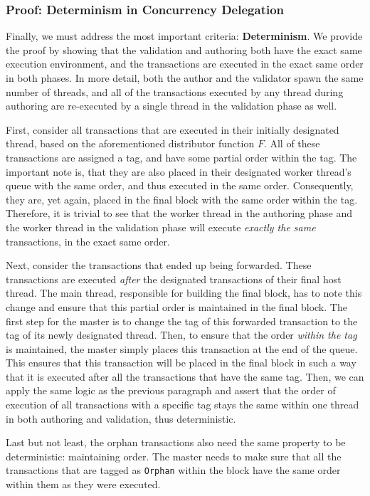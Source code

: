 \subsubsection{Proof: Determinism in Concurrency Delegation}

Finally, we must address the most important criteria: \textbf{Determinism}. We provide the proof by
showing that the validation and authoring both have the exact same execution environment, and the
transactions are executed in the exact same order in both phases. In more detail, both the author
and the validator spawn the same number of threads, and all of the transactions executed by any
thread during authoring are re-executed by a single thread in the validation phase as well.

First, consider all transactions that are executed in their initially designated thread, based on
the aforementioned distributor function $F$. All of these transactions are assigned a tag, and have
some partial order within the tag. The important note is, that they are also placed in their
designated worker thread's queue with the same order, and thus executed in the same order.
Consequently, they are, yet again, placed in the final block with the same order within the tag.
Therefore, it is trivial to see that the worker thread in the authoring phase and the worker thread
in the validation phase will execute \textit{exactly the same} transactions, in the exact same
order.

Next, consider the transactions that ended up being forwarded. These transactions are
executed \textit{after} the designated transactions of their final host thread. The main thread,
responsible for building the final block, has to note this change and ensure that this partial
order is maintained in the final block. The first step for the master is to change the tag of this
forwarded transaction to the tag of its newly designated thread. Then, to ensure that the order
\textit{within the tag} is maintained, the master simply places this transaction at the end
of the queue. This ensures that this transaction will be placed in the final block in such a way
that it is executed after all the transactions that have the same tag. Then, we can apply the same
logic as the previous paragraph and assert that the order of execution of all transactions with a
specific tag stays the same within one thread in both authoring and validation, thus deterministic.

Last but not least, the orphan transactions also need the same property to be deterministic:
maintaining order. The master needs to make sure that all the transactions that are tagged as
\texttt{Orphan} within the block have the same order within them as they were executed. 

